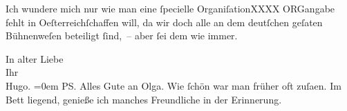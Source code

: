 \pstart
           Ich wundere mich nur wie man eine ſpecielle OrganiſationXXXX ORGangabe fehlt in Oeſterreichſchaffen will, da wir doch alle an dem deutſchen
                  geſa{\geminationm}ten Bühnenweſen beteiligt ſind, – aber ſei dem
               wie immer.\pend
           
\pstart
           In alter Liebe{\\[\baselineskip]}Ihr{\\[\baselineskip]}\spacefill\mbox{Hugo.}\pend
           \leftskip=0em{}
\pstart
           \noindent{}\textsc{PS}. Alles Gute an Olga. Wie ſchön war man früher oft zuſa{\geminationm}en.
                  Im Bett liegend, genieße ich manches Freundliche in der Erinnerung.\pend
           \endnumbering{}  
      